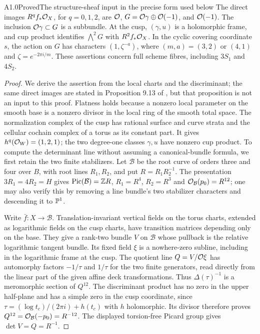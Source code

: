 \begin{claim}{A1.0}{Proved}{The structure-sheaf input in the precise form used below}
The direct images $R^qf_*\mathcal O_X$, for $q=0,1,2$, are
$\mathcal O$, $G=\mathcal O\gamma\oplus\mathcal O(-1)$, and $\mathcal O(-1)$.
The inclusion $\mathcal O\gamma\subset G$ is a subbundle.  At the cusp,
$(\gamma,u)$ is a holomorphic frame, and cup product identifies
$\bigwedge^2G$ with $R^2f_*\mathcal O_X$.  In the cyclic covering coordinate
$s$, the action on $G$ has characters $(1,\zeta^{-a})$, where
$(m,a)=(3,2)$ or $(4,1)$ and $\zeta=e^{-2\pi i/m}$.
These assertions concern full scheme fibres, including $3S_1$ and $4S_2$.
\end{claim}
\begin{proof}
We derive the assertion from the local charts and the discriminant;
the same direct images are stated in Proposition 9.13 of
\citet{AC2026}, but that proposition is not an input to this proof.
Flatness holds
because a nonzero local parameter on the smooth base is a nonzero divisor
in the local ring of the smooth total space.  The normalization complex
of the cusp has rational surface and curve strata and the cellular
cochain complex of a torus as its constant part.  It gives
$h^q(\mathcal O_W)=(1,2,1)$; the two degree-one classes $\gamma,u$ have nonzero
cup product.  To compute the determinant line without assuming a
canonical-bundle formula, we first retain the two finite stabilizers.
Let $\mathcal B$ be the root curve of orders three and four over $B$,
with root lines $R_1,R_2$, and put $R=R_1R_2^{-1}$.  The presentation
$3R_1=4R_2=H$ gives $\operatorname{Pic}(\mathcal B)=\mathbb Z R$,
$R_1=R^4$, $R_2=R^3$ and $\mathcal O_{\mathcal B}(p_0)=R^{12}$;
one may also verify this by removing a line bundle's two stabilizer
characters and descending it to $\mathbb P^1$.

Write $\bar f:X\to\mathcal B$.  Translation-invariant vertical
fields on the torus charts, extended as logarithmic fields on the cusp
charts, have transition matrices depending only on the base.  They
give a rank-two bundle $V$ on $\mathcal B$ whose pullback is the
relative logarithmic tangent bundle.  Its fixed field $\xi$ is a
nowhere-zero subline, including in the logarithmic frame at the cusp.
The quotient line $Q=V/\mathcal O\xi$ has automorphy factors $-1/\tau$
and $1/\tau$ for the two finite generators, read directly from the
linear part of the given affine deck transformations.  Thus
$\Delta(\tau)^{-1}$ is a meromorphic section of $Q^{12}$.
The discriminant product has no zero in the upper half-plane and
has a simple zero in the cusp coordinate, since
$\tau=(\log t_c)/(2\pi i)+h(t_c)$ with $h$ holomorphic.  Its divisor
therefore proves $Q^{12}=\mathcal O_{\mathcal B}(-p_0)=R^{-12}$.
The displayed torsion-free Picard group gives
$\det V=Q=R^{-1}$.


\end{proof}
